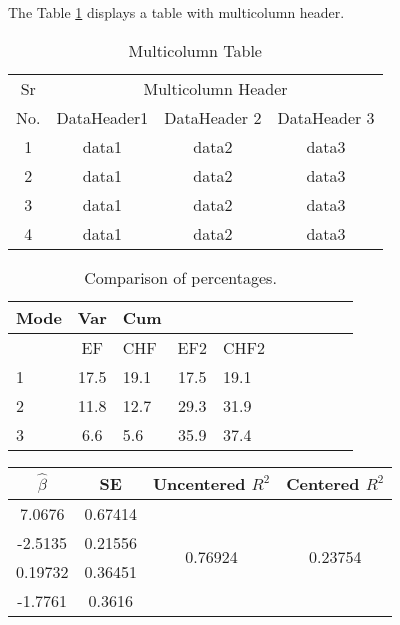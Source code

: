 \documentclass[12pt,letterpaper]{article}
\begin{document}
The Table \ref{multicolumn_table} displays a table with multicolumn header. 

\begin{table} [ht]
	\centering
	\begin{tabular}{|c|c|c|c|}
		\hline
		Sr & \multicolumn{3}{c|}{Multicolumn Header} \\
		\cline{2-4}
		No. & DataHeader1 & DataHeader 2 & DataHeader 3 \\
		\hline 
		1 & data1 & data2 & data3 \\
		\hline
		2 & data1 & data2 & data3 \\
		\hline
		3 & data1 & data2 & data3 \\
		\hline
		4 & data1 & data2 & data3 \\
		\hline
	\end{tabular}
	\caption{Multicolumn Table}
	\label{multicolumn_table}
\end{table}





\begin{table}[!h] 
\caption{Comparison of percentages.}
\begin{tabular}{lclclclclc}
\hline
\hline 
Mode &  Var  &  Cum\\
\hline
{}       & EF   & CHF    & EF2   & CHF2\\
1   &  17.5 & 19.1   & 17.5  & 19.1\\
2   &  11.8 & 12.7   & 29.3  &  31.9\\
3   &  6.6  &  5.6         & 35.9    &  37.4\\
\hline
\end{tabular}
\end{table}



\begin{table}[h!]
\centering
 \begin{tabular}{||c|c|c|c||} 
 \hline
 $\hat{\beta}$ & SE & Uncentered $R^2$ & Centered $R^2$ \\ [0.5ex] 
 \hline
 7.0676  & 0.67414 & \multirow{4}{4em}{0.76924} & \multirow{4}{4em}{0.23754} \\
 -2.5135  & 0.21556 & &\\
 0.19732  & 0.36451 & &\\
 -1.7761 & 0.3616 & &\\ [1ex] 
 \hline
 \end{tabular}
\end{table}
\end{document}
